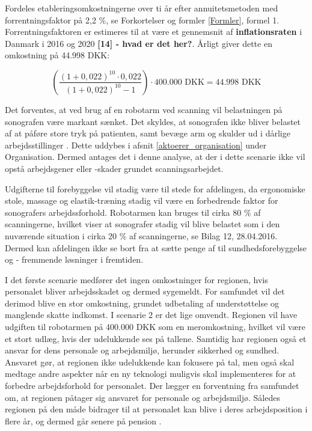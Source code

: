 Fordeles etableringsomkostningerne over ti år efter annuitetsmetoden med forrentningsfaktor på 2,2 \%, se Forkortelser og formler \ref{Formler}, formel 1. Forrentningsfaktoren er estimeres til at være et gennemsnit af \textbf{inflationsraten} i Danmark i 2016 og 2020 \textbf{[14] - hvad er det her?}. Årligt giver dette en omkostning på 44.998 DKK:

\begin{equation}
\left(\frac{(1+0,022)^{10}\cdot0,022}{(1+0,022)^{10}-1}\right)\cdot400.000 \text{ DKK}=44.998 \text{ DKK}
\end{equation}

Det forventes, at ved brug af en robotarm ved scanning vil belastningen på sonografen være markant sænket. Det skyldes, at sonografen ikke bliver belastet af at påføre store tryk på patienten, samt bevæge arm og skulder ud i dårlige arbejdsstillinger \cite{31}. Dette uddybes i afsnit \ref{aktoerer_organisation} under Organisation. Dermed antages det i denne analyse, at der i dette scenarie ikke vil opstå arbejdsgener eller -skader grundet scanningsarbejdet. 

Udgifterne til forebyggelse vil stadig være til stede for afdelingen, da ergonomiske stole, massage og elastik-træning stadig vil være en forbedrende faktor for sonografers arbejdssforhold. Robotarmen kan bruges til cirka 80 \% af scanningerne, hvilket viser at sonografer stadig vil blive belastet som i den nuværende situation i cirka 20 \% af scanningerne, se Bilag 12, 28.04.2016. Dermed kan afdelingen ikke se bort fra at sætte penge af til sundhedsforebyggelse og - fremmende løsninger i fremtiden.  

I det første scenarie medfører det ingen omkostninger for regionen, hvis personalet bliver arbejdsskadet og dermed sygemeldt. For samfundet vil det derimod blive en stor omkostning, grundet udbetaling af understøttelse og manglende skatte indkomst. I scenarie 2 er det lige omvendt. Regionen vil have udgiften til robotarmen på 400.000 DKK som en meromkostning, hvilket vil være et stort udlæg, hvis der udelukkende ses på tallene. Samtidig har regionen også et ansvar for dens personale og arbejdsmiljø, herunder sikkerhed og sundhed. \\
Ansvaret gør, at regionen ikke udelukkende kan fokusere på tal, men også skal medtage andre aspekter når en ny teknologi muligvis skal implementeres for at forbedre arbejdsforhold for personalet. Der lægger en forventning fra samfundet om, at regionen påtager sig ansvaret for personale og arbejdsmiljø. Således regionen på den måde bidrager til at personalet kan blive i deres arbejdsposition i flere år, og dermed går senere på pension \cite{Arbejdsmiljo} \cite{RegionAnsvar}. 

